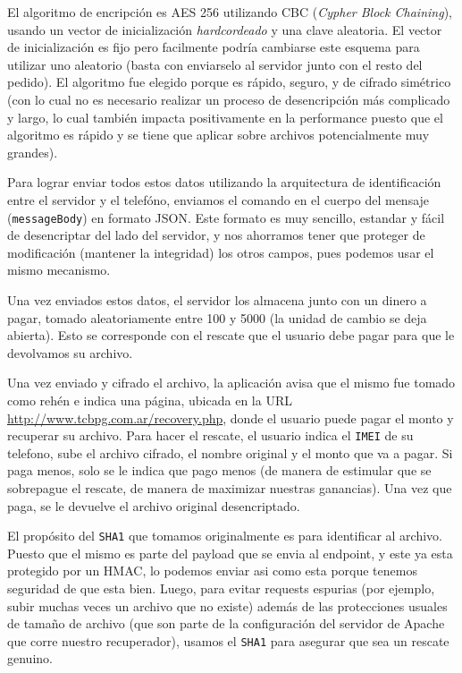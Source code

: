 El algoritmo de encripción es AES 256 utilizando CBC (\textit{Cypher Block Chaining}), usando un vector de inicialización \textit{hardcordeado}
y una clave aleatoria. El vector de inicialización es fijo pero facilmente podría cambiarse este esquema para utilizar uno aleatorio (basta con
enviarselo al servidor junto con el resto del pedido). El algoritmo fue elegido porque es rápido, seguro, y de cifrado simétrico (con lo cual
no es necesario realizar un proceso de desencripción más complicado y largo, lo cual también impacta positivamente en la performance puesto que
el algoritmo es rápido y se tiene que aplicar sobre archivos potencialmente muy grandes).

Para lograr enviar todos estos datos utilizando la arquitectura de identificación entre el servidor y el
telefóno, enviamos el comando en el cuerpo del mensaje (\texttt{messageBody}) en formato JSON. Este formato
es muy sencillo, estandar y fácil de desencriptar del lado del servidor, y nos ahorramos tener que proteger
de modificación (mantener la integridad) los otros campos, pues podemos usar el mismo mecanismo.

Una vez enviados estos datos, el servidor los almacena junto con un dinero a pagar, tomado aleatoriamente entre 100 y 5000 (la unidad de cambio se deja abierta). Esto se corresponde con el rescate que el usuario debe pagar para que le devolvamos su archivo.

Una vez enviado y cifrado el archivo, la aplicación avisa que el mismo fue tomado como rehén e indica una página, ubicada en la URL
\url{http://www.tcbpg.com.ar/recovery.php}, donde el usuario puede pagar el monto y recuperar su archivo. Para hacer el rescate, el usuario
indica el \texttt{IMEI} de su telefono, sube el archivo cifrado, el nombre original y el monto que va a pagar. Si paga menos, solo se le indica que pago
menos (de manera de estimular que se sobrepague el rescate, de manera de maximizar nuestras ganancias). Una vez que paga, se le devuelve el
archivo original desencriptado.

El propósito del \texttt{SHA1} que tomamos originalmente es para identificar al archivo. Puesto que el mismo es parte del payload que se envia al
endpoint, y este ya esta protegido por un HMAC, lo podemos enviar asi como esta porque tenemos seguridad de que esta bien. Luego, para evitar
requests espurias (por ejemplo, subir muchas veces un archivo que no existe) además de las protecciones usuales de tamaño de archivo (que son parte de la configuración del servidor de Apache que corre nuestro recuperador), usamos el \texttt{SHA1} para asegurar que sea un rescate genuino.

